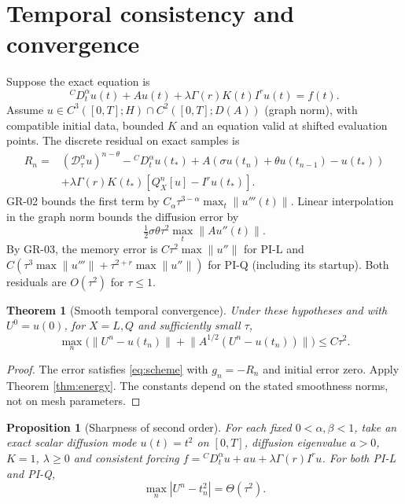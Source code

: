 \documentclass[11pt,a4paper]{article}
\newtheorem{theorem}{Theorem}
\newtheorem{proposition}{Proposition}
\newcommand{\norm}[1]{\lVert#1\rVert}
\newcommand{\D}{\mathcal D_\tau^\alpha}
\begin{document}
\section{Temporal consistency and convergence}
Suppose the exact equation is
\[
 {}^CD_t^\alpha u(t)+Au(t)+\lambda\Gamma(r)K(t)I^ru(t)=f(t).
\]
Assume $u\in C^3([0,T];H)\cap C^2([0,T];D(A))$ (graph norm), with compatible initial data, bounded $K$ and an equation valid at shifted evaluation points. The discrete residual on exact samples is
\begin{align*}
 R_n={}&(\D u)^{n-\theta}-{}^CD_t^\alpha u(t_*)
 +A(\sigma u(t_n)+\theta u(t_{n-1})-u(t_*))\\
 &+\lambda\Gamma(r)K(t_*)[Q_X^n[u]-I^ru(t_*)].
\end{align*}
GR-02 bounds the first term by $C_\alpha\tau^{3-\alpha}\max_t\norm{u'''(t)}$. Linear interpolation in the graph norm bounds the diffusion error by
\[
 \tfrac12\sigma\theta\tau^2\max_t\norm{Au''(t)}.
\]
By GR-03, the memory error is $C\tau^2\max\norm{u''}$ for PI-L and $C(\tau^3\max\norm{u'''}+\tau^{2+r}\max\norm{u''})$ for PI-Q (including its startup). Both residuals are $O(\tau^2)$ for $\tau\le1$.
\begin{theorem}[Smooth temporal convergence]\label{thm:time}
Under these hypotheses and with $U^0=u(0)$, for $X=L,Q$ and sufficiently small $\tau$,
\[
 \max_n\big(\norm{U^n-u(t_n)}+\norm{A^{1/2}(U^n-u(t_n))}\big)\le C\tau^2.
\]
\end{theorem}
\begin{proof}
The error satisfies \eqref{eq:scheme} with $g_n=-R_n$ and initial error zero. Apply Theorem \ref{thm:energy}. The constants depend on the stated smoothness norms, not on mesh parameters.
\end{proof}
\begin{proposition}[Sharpness of second order]\label{prop:sharp}
For each fixed $0<\alpha,\beta<1$, take an exact scalar diffusion mode $u(t)=t^2$ on $[0,T]$, diffusion eigenvalue $a>0$, $K=1$, $\lambda\ge0$ and consistent forcing $f={}^CD_t^\alpha u+au+\lambda\Gamma(r)I^ru$. For both PI-L and PI-Q,
\[\max_n|U^n-t_n^2|=\Theta(\tau^2).\]
\end{proposition}
\end{document}
